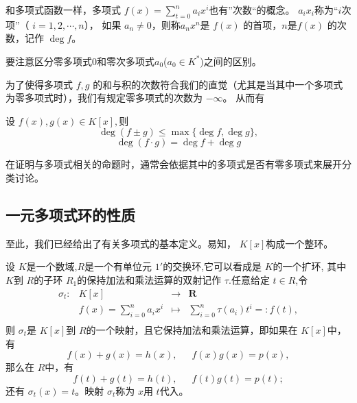 和多项式函数一样，多项式 $f(x)=\sum_{t=0}^na_ix^i$也有”次数“的概念。 $a_ix_i$称为“$i$次项”（ $i=1,2,\cdots,n$），
如果 $a_n\neq 0$，则称$a_nx^n$是 $f(x)$ 的首项，$n$是$f(x)$ 的次数，记作 $\deg f$。
\begin{myrmk}
    要注意区分零多项式0和零次多项式$a_0$($a_0\in K^*$)之间的区别。
\end{myrmk}
为了使得多项式 $f,g$ 的和与积的次数符合我们的直觉（尤其是当其中一个多项式为零多项式时），我们有规定零多项式的次数为 $-\infty$。
从而有
\begin{myprop}
    设 $f(x),g(x)\in K[x],$则
    \[\deg(f\pm g)\leq\max\{\deg f,\deg g\},\]
    \[\deg(f\cdot g)=\deg f+\deg g\]
\end{myprop}
\begin{myrmk}
    在证明与多项式相关的命题时，通常会依据其中的多项式是否有零多项式来展开分类讨论。
\end{myrmk}
\subsection{一元多项式环的性质}
至此，我们已经给出了有关多项式的基本定义。易知， $K[x]$构成一个整环。
\begin{mythm}[一元多项式环的通用性质]
    设 $K$是一个数域,$R$是一个有单位元 $1'$的交换环,它可以看成是 $K$的一个扩环,
    其中 $K$到 $R$的子环 $R_1$的保持加法和乘法运算的双射记作 $\tau$.任意给定 $t \in R$,令
    \[
    \begin{array}{rrcl}
    \sigma_{t} : &  K[x] & \longrightarrow  & \mathbf{R} \\
                   &  f(x)=\sum_{i=0}^{n}{a_ix^i}  & \longmapsto    & \sum_{i=0}^{n}{\tau(a_i)t^i}=:f(t), \\
    \end{array}
    \]
    则 $\sigma_t$是 $K[x]$到 $R$的一个映射，且它保持加法和乘法运算，即如果在 $K[x]$中，有
    \[f(x)+g(x)=h(x),\phantom{111}f(x)g(x)=p(x),\]
    那么在 $R$中，有
    \[f(t)+g(t)=h(t),\phantom{111}f(t)g(t)=p(t);\]
    还有 $\sigma_t(x)=t$。映射 $\sigma_t$称为 $x$用 $t$代入。
\end{mythm}

